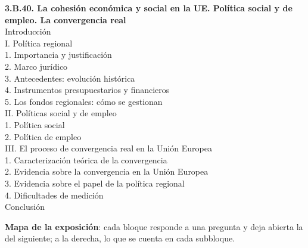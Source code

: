 \documentclass[11pt]{article}
\begin{document}
\begin{esquema}[unbreakable]
\textbf{3.B.40. La cohesión económica y social en la UE. Política social y de empleo. La convergencia real}\\[2pt]
Introducción\\
I. Política regional\\
\hspace*{1.5em}1. Importancia y justificación\\
\hspace*{1.5em}2. Marco jurídico\\
\hspace*{1.5em}3. Antecedentes: evolución histórica\\
\hspace*{1.5em}4. Instrumentos presupuestarios y financieros\\
\hspace*{1.5em}5. Los fondos regionales: cómo se gestionan\\
II. Políticas social y de empleo\\
\hspace*{1.5em}1. Política social\\
\hspace*{1.5em}2. Política de empleo\\
III. El proceso de convergencia real en la Unión Europea\\
\hspace*{1.5em}1. Caracterización teórica de la convergencia\\
\hspace*{1.5em}2. Evidencia sobre la convergencia en la Unión Europea\\
\hspace*{1.5em}3. Evidencia sobre el papel de la política regional\\
\hspace*{1.5em}4. Dificultades de medición\\
Conclusión
\end{esquema}


\begin{anotaciones}
\textbf{Mapa de la exposición}: cada bloque responde a una pregunta y deja abierta la del siguiente; a la derecha, lo que se cuenta en cada subbloque.
\begin{infografiacaja}
\caption{Mapa del tema: la pregunta de cada bloque, sus subbloques y el hilo que los une}\label{figu:mapa-tema}
\end{infografiacaja}
\end{anotaciones}
\end{document}
